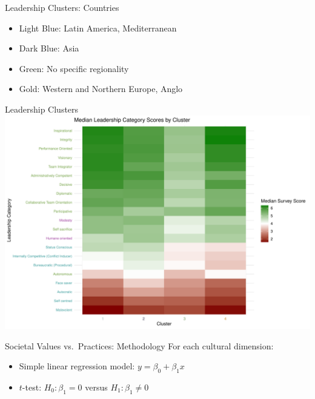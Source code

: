 \documentclass[
  ignorenonframetext,
]{beamer}
\providecommand{\tightlist}{%
  \setlength{\itemsep}{0pt}\setlength{\parskip}{0pt}}
\begin{document}
\begin{frame}{Leadership Clusters: Countries}
\protect\hypertarget{leadership-clusters-countries-1}{}

\begin{itemize}
\tightlist
\item
  \textcolor{clust4}{Light Blue}: Latin America, Mediterranean
\item
  \textcolor{clust5}{Dark Blue}: Asia
\item
  \textcolor{clust6}{Green}: No specific regionality
\item
  \textcolor{clust7}{Gold}: Western and Northern Europe, Anglo
\end{itemize}
\end{frame}

\begin{frame}{Leadership Clusters}
\protect\hypertarget{leadership-clusters}{}
\includegraphics{final_slides_files/figure-beamer/cluster_values-1.pdf}
\end{frame}

\begin{frame}{Societal Values vs.~Practices: Methodology}
\protect\hypertarget{societal-values-vs.-practices-methodology}{}
For each cultural dimension:

\begin{itemize}
\item
  Simple linear regression model: \(y = \beta_0 + \beta_1 x\)
\item
  \(t\)-test: \(H_0: \beta_1 = 0\) versus \(H_1: \beta_1 \ne 0\)
\end{itemize}
\end{frame}
\end{document}
